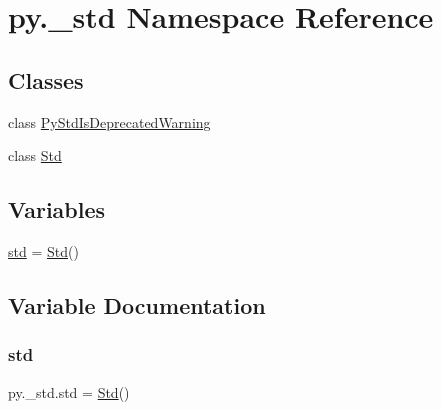 \hypertarget{namespacepy_1_1__std}{}\section{py.\+\_\+std Namespace Reference}
\label{namespacepy_1_1__std}
\subsection*{Classes}
\begin{DoxyCompactItemize}
\item 
class \hyperlink{classpy_1_1__std_1_1_py_std_is_deprecated_warning}{Py\+Std\+Is\+Deprecated\+Warning}
\item 
class \hyperlink{classpy_1_1__std_1_1_std}{Std}
\end{DoxyCompactItemize}
\subsection*{Variables}
\begin{DoxyCompactItemize}
\item 
\hyperlink{namespacepy_1_1__std_a187317ae6a8799e93b756bf87f4b8e62}{std} = \hyperlink{classpy_1_1__std_1_1_std}{Std}()
\end{DoxyCompactItemize}


\subsection{Variable Documentation}
\mbox{\label{namespacepy_1_1__std_a187317ae6a8799e93b756bf87f4b8e62}} 
\subsubsection{\texorpdfstring{std}{std}}
{\footnotesize\ttfamily py.\+\_\+std.\+std = \hyperlink{classpy_1_1__std_1_1_std}{Std}()}

